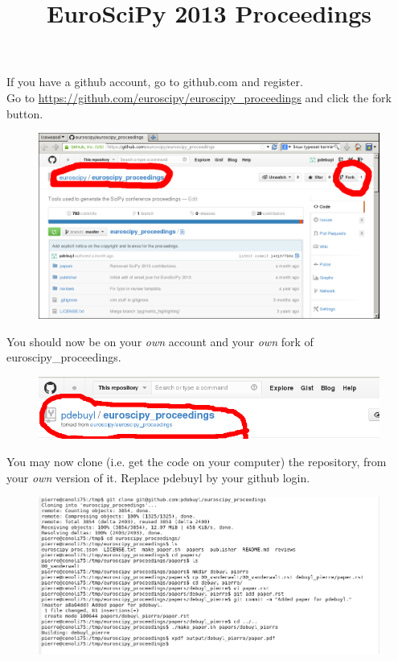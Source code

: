 \documentclass[portrait]{sciposter}
\title{EuroSciPy 2013 Proceedings}
\author{}
\institute{}
\begin{document}

\maketitle

\begin{multicols}{2}

If you have a github account, go to github.com and register.\\

Go to \url{https://github.com/euroscipy/euroscipy_proceedings} and click the
fork button.

  \begin{figure}[h]
    \centering
    \includegraphics[width=\linewidth]{fork_draw}
  \end{figure}

  You should now be on your {\em own} account and your {\em own} fork of
  euroscipy\_proceedings.

  \begin{figure}[h]
    \centering
    \includegraphics[width=0.7\linewidth]{myfork_draw}
  \end{figure}

  You may now clone (i.e. get the code on your computer) the repository, from
  your {\em own} version of it. Replace pdebuyl by your github login.

  \begin{figure}[h]
    \centering
    \includegraphics[width=\linewidth]{txt}
  \end{figure}


\end{multicols}
\end{document}
